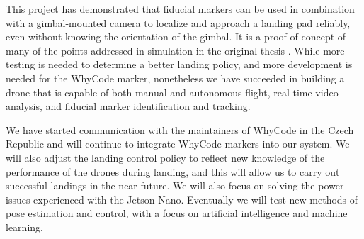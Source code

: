 This project has demonstrated that fiducial markers can be used in combination with a gimbal-mounted camera to localize and approach a landing pad reliably, even without knowing the orientation of the gimbal. It is a proof of concept of many of the points addressed in simulation in the original thesis \cite{AL_thesis}. While more testing is needed to determine a better landing policy, and more development is needed for the WhyCode marker, nonetheless we have succeeded in building a drone that is capable of both manual and autonomous flight, real-time video analysis, and fiducial marker identification and tracking.

We have started communication with the maintainers of WhyCode in the Czech Republic and will continue to integrate WhyCode markers into our system. We will also adjust the landing control policy to reflect new knowledge of the performance of the drones during landing, and this will allow us to carry out successful landings in the near future. We will also focus on solving the power issues experienced with the Jetson Nano. Eventually we will test new methods of pose estimation and control, with a focus on artificial intelligence and machine learning.